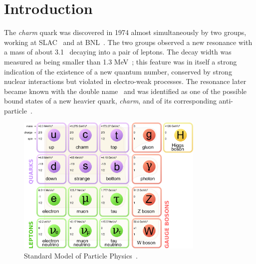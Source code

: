 \documentclass[12pt, a4paper, twoside, titlepage]{article}
\begin{document}
\tableofcontents %
\newpage

\section{Introduction}
The \emph{charm} quark was discovered in 1974 almost simultaneously by two groups, working at SLAC~\cite{Richter:1974} and at BNL~\cite{Ting:1974}.
The two groups observed a new resonance with a mass of about 3.1 \GeVcsq\ decaying into a pair of leptons.
The decay width was measured as being smaller than 1.3 MeV~\cite{Richter:1974}; this feature
was in itself a strong indication of the existence of a new quantum number, conserved by strong nuclear interactions 
but violated in electro-weak processes.
The resonance later became known with the double name \jpsi\ and was identified as one of the possible bound states
of a new heavier quark, \emph{charm}, and of its corresponding anti-particle~\cite{Appelquist:1975, DeRujula:1975}. 

\begin{figure}[tbh]
\begin{center}
\includegraphics[width=0.8\textwidth]{img/standard_model}
 \caption{Standard Model of Particle Physics~\cite{Wikipedia:StandardModel}.} 
 \label{fig:standard_model}
\end{center}
\end{figure}
\end{document}
